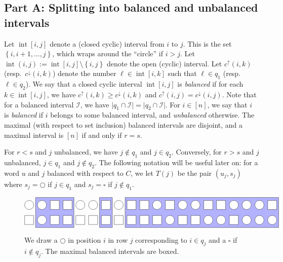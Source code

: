 \documentclass[submission]{FPSAC2018}
\DeclareMathOperator{\inter}{int} %
\newcommand{\mcI}{\mathcal{I}}
\newcommand{\set}[1]{\left\{ #1 \right\}}
\newcommand{\ive}[1]{\left[ #1 \right]}
\newcommand{\defn}[1]{{\color{darkred}\emph{#1}}} %
\theoremstyle{plain}
\theoremstyle{definition}
\numberwithin{equation}{section}
\begin{document}
\subsection*{Part A: Splitting into balanced and unbalanced intervals}

Let $\inter[i,j]$ denote a (closed cyclic) interval from $i$ to $j$.
This is the set $\set{i, i+1, \ldots, j}$, which wraps around the ``circle'' if $i > j$.
Let $\inter(i,j) := \inter[i,j] \setminus \set{i,j}$ denote the open (cyclic) interval.
Let $c^{\uparrow}(i,k)$ (resp.~$c^{\downarrow}(i,k)$) denote the number $\ell \in \inter[i,k]$ such that $\ell \in q_1$ (resp.~$\ell \in q_2$).
We say that a closed cyclic interval $\inter[i,j]$ is \defn{balanced} if for each $k \in \inter[i,j]$, we have $c^\uparrow(i,k) \geq c^\downarrow(i,k)$ and $c^{\uparrow}(i,j) = c^{\downarrow}(i,j)$.
Note that for a balanced interval $\mcI$, we have $\lvert q_1 \cap \mcI \rvert = \lvert q_2 \cap \mcI \rvert$.
For $i \in \ive{n}$, we say that $i$ is \defn{balanced} if $i$ belongs to some balanced interval, and \defn{unbalanced} otherwise.
The maximal (with respect to set inclusion) balanced intervals are disjoint, and a maximal interval is $[n]$ if and only if $r = s$.

For $r < s$ and $j$ unbalanced, we have $j \notin q_1$ and $j \in q_2$.
Conversely, for $r > s$ and $j$ unbalanced, $j \in q_1$ and $j \notin q_2$.
The following notation will be useful later on: for a word $u$ and $j$ balanced with respect to $C$, we let $T(j)$ be the pair $(u_j, s_j)$ where $s_j = \bigcirc$ if $j \in q_1$ and $s_j = \square$ if $j\notin q_1$.

\begin{figure}[t]
\[
\begin{tikzpicture}[scale=0.9]
  \def\sc{0.85}   %
  \def\ll{2}   %
  \def\l{1}   %
  \draw[fill=blue!30] (1.5*\sc,\l-.5) rectangle(4.5*\sc,\ll+.5);
  \draw[fill=blue!30] (6.5*\sc,\l-.5) rectangle(7.5*\sc,\ll+.5);
  \draw[fill=blue!30] (8.5*\sc,\l-.5) rectangle(20.5*\sc,\ll+.5);
  \foreach \i in {1,2,5,6,8,11,13,14,17,18,19} { \draw[fill=white] (\i*\sc,\ll) circle (0.3); }
  \foreach \i in {3,4,7,9,10,12,15,16,20} { \draw[fill=white] (\i*\sc-.3,\ll-.3) rectangle +(0.6,+0.6); }
  \foreach \i in {2,12,15,16,18,19,20} { \draw[fill=white] (\i*\sc,\l) circle (0.3); }
  \foreach \i in {1,3,4,5,6,7,8,9,10,11,13,14,17} { \draw[fill=white] (\i*\sc-.3,\l-.3) rectangle +(0.6,+0.6); }
\end{tikzpicture}
\]
\caption{We draw a $\bigcirc$ in position $i$ in row $j$ corresponding to $i \in q_j$ and a $\square$ if $i \notin q_j$.
The maximal balanced intervals are boxed.}
\label{fig:balanced}
\end{figure}
\end{document}
